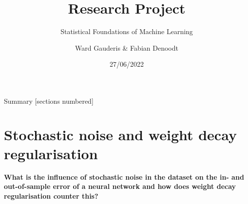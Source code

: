 \documentclass[9.5pt]{beamer}
\title{Research Project}
\subtitle{Statistical Foundations of Machine Learning}
\author{Ward Gauderis \& Fabian Denoodt}
\date{27/06/2022}
\institute{Vrije Universiteit Brussel}
\begin{document}
    \maketitle

    \begin{frame}{Summary}
        [sections numbered]
        \tableofcontents
    \end{frame}


    \section{Stochastic noise and weight decay regularisation}
    \begin{frame}
        \textbf{What is the influence of stochastic noise in the dataset on the in- and out-of-sample error of a neural network and how does weight decay regularisation counter this?}
    \end{frame}
\end{document}
